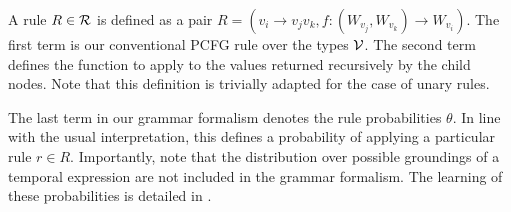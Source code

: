 A rule \mbox{$R \in \mathcal{R}$} is defined as a pair 
	\mbox{$R = \left(v_i \rightarrow v_jv_k, 
		f : (W_{v_j},W_{v_k}) \rightarrow W_{v_i}\right)$}.
The first term is our conventional PCFG rule over the types $\mathcal{V}$.
The second term defines the function to apply to the values returned
	recursively by the child nodes.
Note that this definition is trivially adapted for the case of unary rules.

The last term in our grammar formalism denotes the rule probabilities $\theta$.
In line with the usual interpretation, this defines a probability
	of applying a particular rule $r \in R$.
Importantly, note that the distribution over possible groundings
	of a temporal expression are not included in the grammar
	formalism.
The learning of these probabilities is detailed in .


